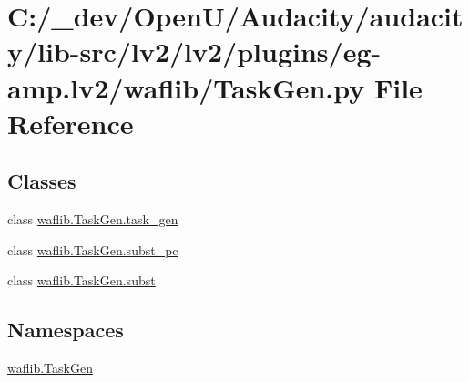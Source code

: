 \hypertarget{lv2_2plugins_2eg-amp_8lv2_2waflib_2_task_gen_8py}{}\section{C\+:/\+\_\+dev/\+Open\+U/\+Audacity/audacity/lib-\/src/lv2/lv2/plugins/eg-\/amp.lv2/waflib/\+Task\+Gen.py File Reference}
\label{lv2_2plugins_2eg-amp_8lv2_2waflib_2_task_gen_8py}
\subsection*{Classes}
\begin{DoxyCompactItemize}
\item 
class \hyperlink{classwaflib_1_1_task_gen_1_1task__gen}{waflib.\+Task\+Gen.\+task\+\_\+gen}
\item 
class \hyperlink{classwaflib_1_1_task_gen_1_1subst__pc}{waflib.\+Task\+Gen.\+subst\+\_\+pc}
\item 
class \hyperlink{classwaflib_1_1_task_gen_1_1subst}{waflib.\+Task\+Gen.\+subst}
\end{DoxyCompactItemize}
\subsection*{Namespaces}
\begin{DoxyCompactItemize}
\item 
 \hyperlink{namespacewaflib_1_1_task_gen}{waflib.\+Task\+Gen}
\end{DoxyCompactItemize}
